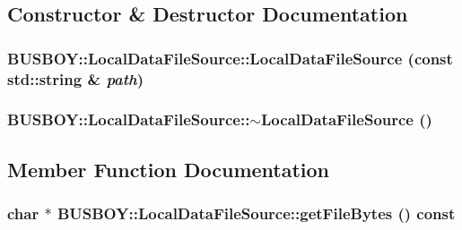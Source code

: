 \subsection{Constructor \& Destructor Documentation}
\hypertarget{classBUSBOY_1_1LocalDataFileSource_ab54e3f2b04898b2f5a37b536c242a78b}{
\subsubsection[{LocalDataFileSource}]{\setlength{\rightskip}{0pt plus 5cm}BUSBOY::LocalDataFileSource::LocalDataFileSource (const std::string \& {\em path})}}
\label{classBUSBOY_1_1LocalDataFileSource_ab54e3f2b04898b2f5a37b536c242a78b}
\hypertarget{classBUSBOY_1_1LocalDataFileSource_a7c14304fe18454e0d6c1d3bcc6c4904c}{
\subsubsection[{$\sim$LocalDataFileSource}]{\setlength{\rightskip}{0pt plus 5cm}BUSBOY::LocalDataFileSource::$\sim$LocalDataFileSource ()}}
\label{classBUSBOY_1_1LocalDataFileSource_a7c14304fe18454e0d6c1d3bcc6c4904c}


\subsection{Member Function Documentation}
\hypertarget{classBUSBOY_1_1LocalDataFileSource_a15f28fad4b6a526d1a0ab341e133bbaa}{
\subsubsection[{getFileBytes}]{\setlength{\rightskip}{0pt plus 5cm}char $\ast$ BUSBOY::LocalDataFileSource::getFileBytes () const}}
\label{classBUSBOY_1_1LocalDataFileSource_a15f28fad4b6a526d1a0ab341e133bbaa}


